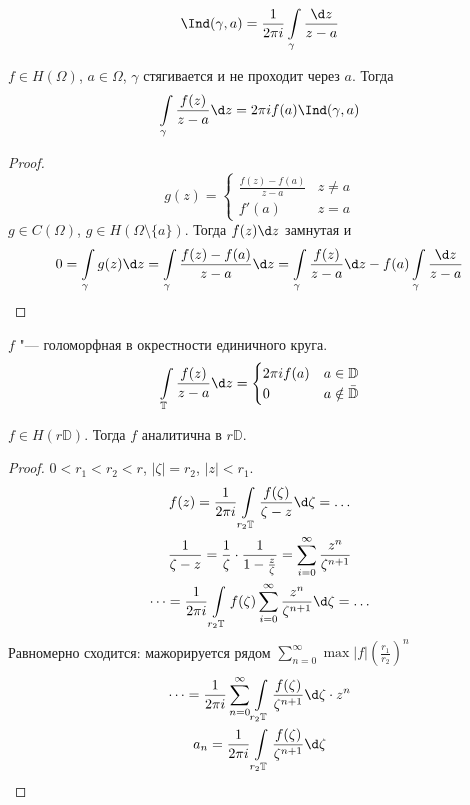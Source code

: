 \begin{conseq}
	\[ \Ind(\gamma, a) = \frac1{2\pi i} \int\limits_\gamma \frac{\d z}{z-a} \]
\end{conseq}

\begin{theorem}
	$f \in H(\Omega)$, $a \in \Omega$, $\gamma$ стягивается и не проходит через $a$.
	Тогда
	\[ \int\limits_\gamma \frac{f(z)}{z-a} \d z = 2\pi i f(a) \Ind(\gamma, a) \]
\end{theorem}
\begin{proof}
	\[ g(z) = \begin{cases} \frac{f(z) - f(a)}{z-a} & z \ne a \\ f'(a) & z = a \end{cases} \]
	$g \in C(\Omega)$, $g \in H(\Omega \setminus \{a\})$.
	Тогда $f(z) \d z$ замнутая и
	\begin{gather*}
		0 = \int\limits_\gamma g(z) \d z
		= \int\limits_\gamma \frac{f(z) - f(a)}{z - a} \d z
		= \int\limits_\gamma \frac{f(z)}{z-a} \d z - f(a) \int\limits_\gamma \frac{\d z}{z - a}
	\end{gather*}
\end{proof}

\begin{conseq}
	$f$ "--- голоморфная в окрестности единичного круга.
	\[
		\int\limits_{\mathbb T} \frac{f(z)}{z - a} \d z = \begin{cases}
			2\pi i f(a) & a \in \mathbb D \\
			0 & a \notin \bar {\mathbb D}
		\end{cases}
	\]
\end{conseq}

\begin{theorem}
	$f \in H(r\mathbb D)$.
	Тогда $f$ аналитична в $r\mathbb D$.
\end{theorem}

\begin{proof}
	$0 < r_1 < r_2 < r$, $|\zeta| = r_2$, $|z| < r_1$.
	\begin{gather*}
		f(z) = \frac1{2\pi i} \int\limits_{r_2\mathbb T} \frac{f(\zeta)}{\zeta - z} \d \zeta = \dots \\
		\frac1{\zeta - z} = \frac1\zeta \cdot \frac1{1- \frac z\zeta} = \sum_{i=0}^\infty \frac{z^n}{\zeta^{n+1}} \\
		\dots = \frac1{2\pi i} \int\limits_{r_2 \mathbb T} f(\zeta) \sum_{i=0}^\infty \frac{z^n}{\zeta^{n+1}} \d \zeta = \dots
	\end{gather*}
	Равномерно сходится: мажорируется рядом $\sum_{n=0}^\infty \max |f| \left(\frac{r_1}{r_2}\right)^n$
	\begin{gather*}
		\dots = \frac1{2\pi i} \sum_{n=0}^\infty \int\limits_{r_2 \mathbb T} \frac{f(\zeta)}{\zeta^{n+1}} \d \zeta \cdot z^n \\
		a_n = \frac1{2\pi i} \int\limits_{r_2 \mathbb T} \frac{f(\zeta)}{\zeta^{n+1}} \d \zeta
	\end{gather*}
\end{proof}

